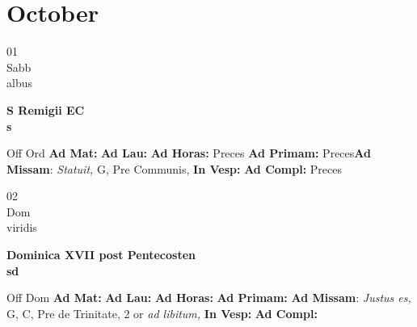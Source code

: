 \documentclass[10pt, openany]{book}
\begin{document}
    \chapter{October}
                    
    \begin{center}
        \begin{minipage}{3.5in}
            \vspace{2em}
            \begin{minipage}{0.5in}
                {\Huge 01} \\
                {\normalsize Sabb} \\
                {\normalsize albus}
            \end{minipage}
            \begin{minipage}{3.0in}
                \textbf{ \large S Remigii EC \\
                \textnormal{\normalsize s}} \\ 
            \end{minipage}
            \begin{justify}Off Ord
                \textbf{Ad Mat: }
                \textbf{Ad Lau: }
                \textbf{Ad Horas: }Preces
                \textbf{Ad Primam: }Preces\textbf{Ad Missam}: \textit{Statuit,} G, Pre Communis,  
                \textbf{In Vesp: }
                \textbf{Ad Compl: }Preces
            \end{justify}
        \end{minipage}
    \end{center}

    \begin{center}
        \begin{minipage}{3.5in}
            \vspace{2em}
            \begin{minipage}{0.5in}
                {\Huge 02} \\
                {\normalsize Dom} \\
                {\normalsize viridis}
            \end{minipage}
            \begin{minipage}{3.0in}
                \textbf{ \large Dominica XVII post Pentecosten \\
                \textnormal{\normalsize sd}} \\ 
            \end{minipage}
            \begin{justify}Off Dom
                \textbf{Ad Mat: }
                \textbf{Ad Lau: }
                \textbf{Ad Horas: }
                \textbf{Ad Primam: }\textbf{Ad Missam}: \textit{Justus es,} G, C, Pre de Trinitate, 2 or \textit{ad libitum,}  
                \textbf{In Vesp: }
                \textbf{Ad Compl: }
            \end{justify}
        \end{minipage}
    \end{center}
\end{document}
